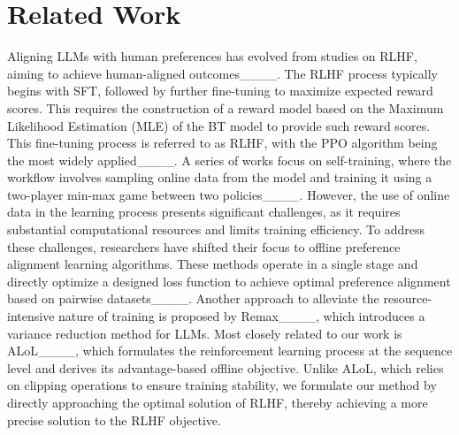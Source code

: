 \section{Related Work}
Aligning LLMs with human preferences has evolved from studies on RLHF, aiming to achieve human-aligned outcomes____. The RLHF process typically begins with SFT, followed by further fine-tuning to maximize expected reward scores. This requires the construction of a reward model based on the Maximum Likelihood Estimation (MLE) of the BT model to provide such reward scores. This fine-tuning process is referred to as RLHF, with the PPO algorithm being the most widely applied____. A series of works focus on self-training, where the workflow involves sampling online data from the model and training it using a two-player min-max game between two policies____. However, the use of online data in the learning process presents significant challenges, as it requires substantial computational resources and limits training efficiency.
%
To address these challenges, researchers have shifted their focus to offline preference alignment learning algorithms. These methods operate in a single stage and directly optimize a designed loss function to achieve optimal preference alignment based on pairwise datasets____. Another approach to alleviate the resource-intensive nature of training is proposed by Remax____, which introduces a variance reduction method for LLMs.
%
Most closely related to our work is ALoL____, which formulates the reinforcement learning process at the sequence level and derives its advantage-based offline objective. Unlike ALoL, which relies on clipping operations to ensure training stability, we formulate our method by directly approaching the optimal solution of RLHF, thereby achieving a more precise solution to the RLHF objective.